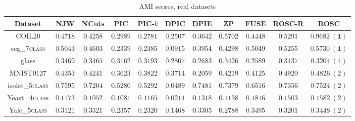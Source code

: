 \begin{table}[!htbp]

\centering
\resizebox{0.85\linewidth}{!}
{
\begin{tabular}{|c||c|c||c|c|c|c||c|c||c|c|} \hline
Dataset &NJW & NCuts & PIC & PIC-$k$ & DPIC & DPIE & ZP & FUSE & ROSC-R & ROSC\\ \hline 
COIL20 &$0.4718$ & $0.4258$  & $0.2989$ & $0.2781$ & $0.2507$ & $0.3642$ & $0.5702$ & $0.4448$ & $0.5291$ & $\bm{0.9682\ (1)}$ \\ \hline
seg\_7\textsc{class} &$0.5043$ & $0.4603$ & $0.2339$ & $0.2385$ & $0.0915$ & $0.3954$ & $0.4298$  & $0.5049$ & $0.5255$ & $\bm{0.5730\ (1)}$ \\ \hline
glass &$\bm{0.3469}$ & $0.3465$  & $0.3162$ & $0.3193$ & $0.2807$ & $0.2683$ & $0.3426$ & $0.2589$ & $0.3137$ & $0.3204\ (4)$ \\ \hline
MNIST0127 & $0.4353$ & $0.4241$  & $0.3623$ & $0.3822$ & $0.3714$ & $0.2059$& $0.4219$ & $0.4125$ & $\bm{0.4920}$ & $0.4826\ (2)$ \\ \hline
isolet\_\textsc{5class}&$\bm{0.7595}$ & $0.7204$  & $0.5280$ & $0.5292$ & $0.0489$ & $0.7481$ & $0.7379$ & $0.6516$ & $0.7356$ & $0.7524\ (2)$ \\ \hline
Yeast\_4\textsc{class}&$0.1173$ & $0.1052$  & $0.1081$ & $0.1165$ & $0.0214$ & $0.1318$ & $0.1138$ & $\bm{0.1816}$ & $0.1503$ & $0.1582\ (2)$ \\ \hline
Yale\_5\textsc{class}&$0.3121$ & $0.3321$  & $0.2357$ & $0.2320$ & $0.1468$ & $0.3305$ & $0.2788$ & $\bm{0.3495}$ & $0.3201$ & $0.3448\ (2)$ \\ \hline
\end{tabular}
}
\caption{AMI scores, real datasets}
\label{table:ami_real}


\end{table}
